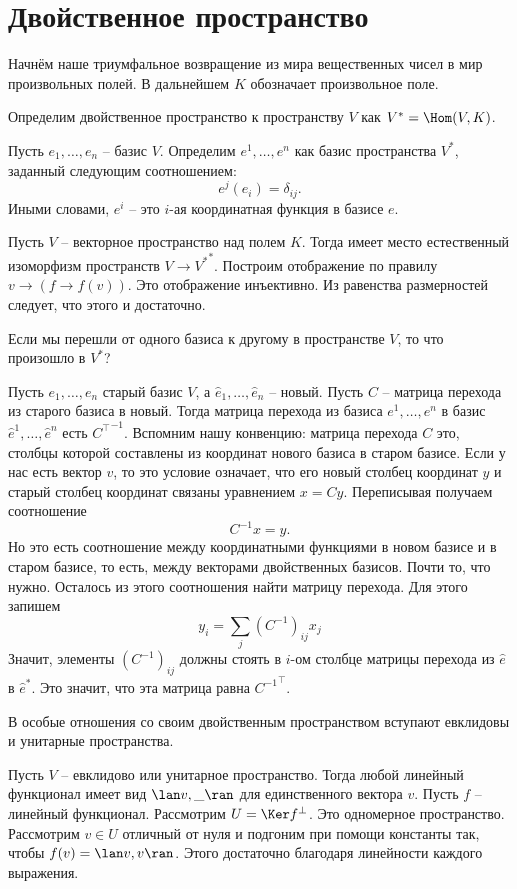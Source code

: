 \section{Двойственное пространство}

Начнём наше триумфальное возвращение из мира вещественных чисел в мир произвольных полей. В дальнейшем $K$ обозначает произвольное поле. 

\dfn Определим двойственное пространство к пространству $V$ как $V^*=\Hom (V, K)$.
\edfn

\dfn Пусть $e_1,\dots,e_n$ -- базис $V$. Определим $e^1,\dots,e^n$ как базис пространства $V^*$, заданный следующим соотношением: 
$$e^j(e_i)=\delta_{ij}.$$
Иными словами, $e^i$ -- это $i$-ая координатная функция в базисе $e$.
\edfn

\utv Пусть $V$ -- векторное пространство над полем $K$. Тогда имеет место естественный изоморфизм пространств $V\to {V^*}^*$.
\eutv
\proof Построим отображение по правилу $v \to (f \to f(v))$. Это отображение инъективно. Из равенства размерностей следует, что этого и достаточно.
\endproof

Если мы перешли от одного базиса к другому в пространстве $V$, то что произошло в $V^*$? 

\thrm Пусть $e_1,\dots,e_n$ старый базис $V$, а $\hat{e}_1,\dots,\hat{e}_n$ -- новый. Пусть $C$ -- матрица перехода из старого базиса в новый. Тогда матрица перехода из базиса $e^1,\dots,e^n$ в базис $\hat{e}^1,\dots,\hat{e}^n$ есть ${C^{\top}}^{-1}$.
\proof Вспомним нашу конвенцию: матрица перехода $C$ это, столбцы которой составлены из координат нового базиса в старом базисе. Если у нас есть вектор $v$, то это условие означает, что его новый столбец координат $y$ и старый столбец координат связаны уравнением $x=Cy$. Переписывая получаем соотношение 
$$C^{-1}x=y.$$
Но это есть соотношение между координатными функциями в новом базисе и в старом базисе, то есть, между векторами двойственных базисов. Почти то, что нужно. Осталось из этого соотношения найти матрицу перехода. Для этого запишем $$y_i=\sum_j (C^{-1})_{ij}x_j$$
Значит, элементы $(C^{-1})_{ij}$ должны стоять в $i$-ом столбце матрицы перехода из $\hat{e}$ в $\hat{e}^*$. Это значит, что эта матрица равна ${C^{-1}}^{\top}$.
\endproof
\ethrm

В особые отношения со своим двойственным пространством вступают евклидовы и унитарные пространства. 

\utv Пусть $V$ -- евклидово или унитарное пространство. Тогда любой линейный функционал имеет вид $\lan v, \_ \ran$ для единственного вектора $v$. 
\eutv
\proof Пусть $f$ -- линейный функционал. Рассмотрим $U=\Ker f^\bot$. Это одномерное пространство. Рассмотрим $v\in U$ отличный от нуля и подгоним при помощи константы так, чтобы  $f(v)=\lan v,v \ran$. Этого достаточно благодаря линейности каждого выражения.  
\endproof

